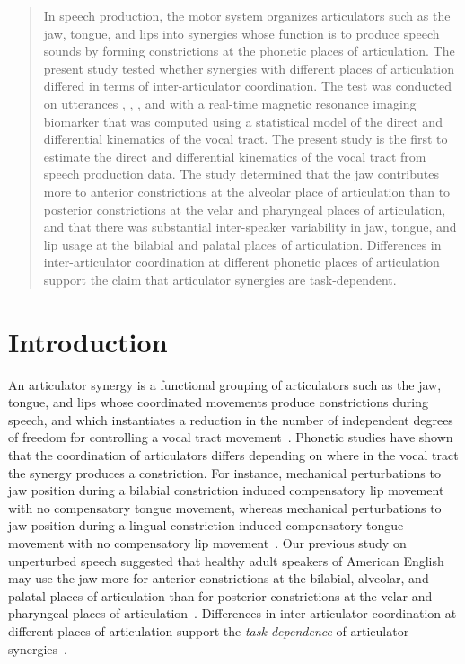 \documentclass[reprint]{JASAnew}\usepackage[]{graphicx}\usepackage[]{color}
\begin{document}
\begin{abstract}
In speech production, the motor system organizes articulators such as the jaw, tongue, and lips into synergies whose function is to produce speech sounds by forming constrictions at the phonetic places of articulation.
%
The present study tested whether synergies with different places of articulation differed in terms of inter-articulator coordination.
%
The test was conducted on utterances \textipa{[apa]}, \textipa{[ata]}, \textipa{[aja]}, and \textipa{[aka]} with a real-time magnetic resonance imaging biomarker that was computed using a statistical model of the direct and differential kinematics of the vocal tract. 
%
The present study is the first to estimate the direct and differential kinematics of the vocal tract from speech production data.
%
The study determined that the jaw contributes more to anterior constrictions at the alveolar place of articulation than to posterior constrictions at the velar and pharyngeal places of articulation, and that there was substantial inter-speaker variability in jaw, tongue, and lip usage at the bilabial and palatal places of articulation. 
%
Differences in inter-articulator coordination at different phonetic places of articulation support the claim that articulator synergies are task-dependent.
\end{abstract}


\maketitle


\section{Introduction}

An articulator synergy is a functional grouping of articulators such as the jaw, tongue, and lips whose coordinated movements produce constrictions during speech, and which instantiates a reduction in the number of independent degrees of freedom for controlling a vocal tract movement~\cite{turvey1977preliminaries}.
%
Phonetic studies have shown that the coordination of articulators differs depending on where in the vocal tract the synergy produces a constriction. 
%
For instance, mechanical perturbations to jaw position during a bilabial constriction induced compensatory lip movement with no compensatory tongue movement, 
%
whereas mechanical perturbations to jaw position during a lingual constriction induced compensatory tongue movement with no compensatory lip movement~\citep{kelso1984functionally}. 
%
Our previous study on unperturbed speech suggested that healthy adult speakers of American English may use the jaw more for anterior constrictions at the bilabial, alveolar, and palatal places of articulation than for posterior constrictions at the velar and pharyngeal places of articulation~\citep{Sorensen+2016}. 
%
Differences in inter-articulator coordination at different places of articulation support the \textit{task-dependence} of articulator synergies~\citep{latash2008synergy}. 
\end{document}

